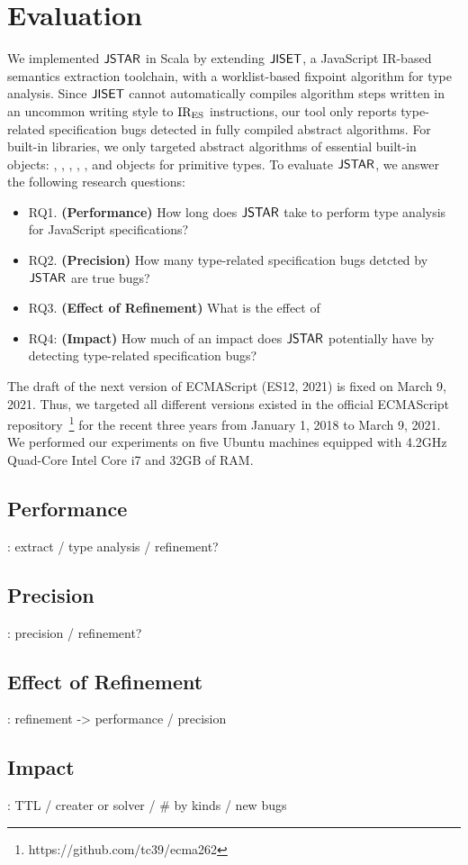 \section{Evaluation}\label{sec:eval}

We implemented $\textsf{JSTAR}$ in Scala by extending $\textsf{JISET}$, a JavaScript IR-based
semantics extraction toolchain, with a worklist-based fixpoint algorithm for
type analysis.  Since $\textsf{JISET}$ cannot automatically compiles algorithm steps
written in an uncommon writing style to ${\text{IR}_\text{ES}}$ instructions, our tool only
reports type-related specification bugs detected in fully compiled abstract
algorithms.  For built-in libraries, we only targeted abstract algorithms of
essential built-in objects: , , ,
, , and objects for primitive types.  To evaluate
$\textsf{JSTAR}$, we answer the following research questions:
\begin{itemize}
  \item RQ1. \textbf{(Performance)} How long does $\textsf{JSTAR}$ take to perform type
    analysis for JavaScript specifications?
  \item RQ2. \textbf{(Precision)} How many type-related specification bugs
    detcted by $\textsf{JSTAR}$ are true bugs?
  \item RQ3. \textbf{(Effect of Refinement)} What is the effect of
  \item RQ4: \textbf{(Impact)} How much of an impact does $\textsf{JSTAR}$ potentially
    have by detecting type-related specification bugs?
\end{itemize}
The draft of the next version of ECMAScript (ES12, 2021) is fixed on March 9,
2021.  Thus, we targeted all different  versions existed in the
official ECMAScript repository~\footnote{https://github.com/tc39/ecma262} for
the recent three years from January 1, 2018 to March 9, 2021.  We performed our
experiments on five Ubuntu machines equipped with 4.2GHz Quad-Core Intel Core i7
and 32GB of RAM.


\subsection{Performance}

\todo: extract / type analysis / refinement?


\subsection{Precision}

\todo: precision / refinement?


\subsection{Effect of Refinement}

\todo: refinement -> performance / precision


\subsection{Impact}

\todo: TTL / creater or solver / \# by kinds / new bugs
